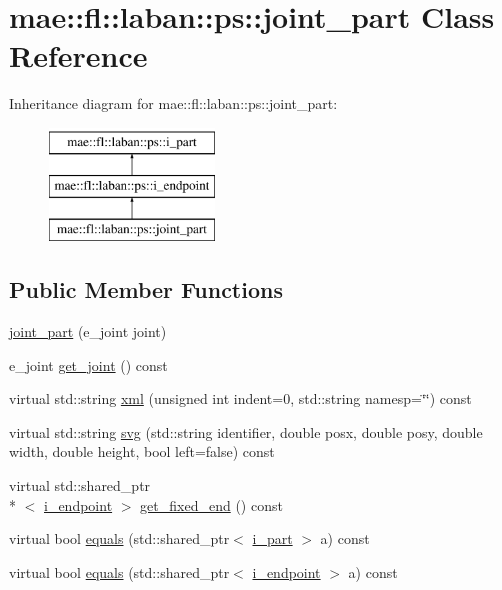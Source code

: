 \hypertarget{classmae_1_1fl_1_1laban_1_1ps_1_1joint__part}{\section{mae\-:\-:fl\-:\-:laban\-:\-:ps\-:\-:joint\-\_\-part Class Reference}
\label{classmae_1_1fl_1_1laban_1_1ps_1_1joint__part}
}
Inheritance diagram for mae\-:\-:fl\-:\-:laban\-:\-:ps\-:\-:joint\-\_\-part\-:\begin{figure}[H]
\begin{center}
\leavevmode
\includegraphics[height=3.000000cm]{classmae_1_1fl_1_1laban_1_1ps_1_1joint__part}
\end{center}
\end{figure}
\subsection*{Public Member Functions}
\begin{DoxyCompactItemize}
\item 
\hyperlink{classmae_1_1fl_1_1laban_1_1ps_1_1joint__part_a7f762c967cd8f22d1f82f5cf15c3de5f}{joint\-\_\-part} (e\-\_\-joint joint)
\item 
e\-\_\-joint \hyperlink{classmae_1_1fl_1_1laban_1_1ps_1_1joint__part_aa7ac33b4e1af216f9359f3f0cb493c0b}{get\-\_\-joint} () const 
\item 
virtual std\-::string \hyperlink{classmae_1_1fl_1_1laban_1_1ps_1_1joint__part_a3054936a94c43d4cb3cb21745234e2cf}{xml} (unsigned int indent=0, std\-::string namesp=\char`\"{}\char`\"{}) const 
\item 
virtual std\-::string \hyperlink{classmae_1_1fl_1_1laban_1_1ps_1_1joint__part_af8e8475612c99842a6b6a18964168592}{svg} (std\-::string identifier, double posx, double posy, double width, double height, bool left=false) const 
\item 
virtual std\-::shared\-\_\-ptr\\*
$<$ \hyperlink{classmae_1_1fl_1_1laban_1_1ps_1_1i__endpoint}{i\-\_\-endpoint} $>$ \hyperlink{classmae_1_1fl_1_1laban_1_1ps_1_1joint__part_a08d427668f18131036b88c2156ccdd3f}{get\-\_\-fixed\-\_\-end} () const 
\item 
virtual bool \hyperlink{classmae_1_1fl_1_1laban_1_1ps_1_1joint__part_a1de75536e4a12e1435e0ec3c4f2edbad}{equals} (std\-::shared\-\_\-ptr$<$ \hyperlink{classmae_1_1fl_1_1laban_1_1ps_1_1i__part}{i\-\_\-part} $>$ a) const 
\item 
virtual bool \hyperlink{classmae_1_1fl_1_1laban_1_1ps_1_1joint__part_ad159de6d5a1adb07b76a4a151541569e}{equals} (std\-::shared\-\_\-ptr$<$ \hyperlink{classmae_1_1fl_1_1laban_1_1ps_1_1i__endpoint}{i\-\_\-endpoint} $>$ a) const 
\end{DoxyCompactItemize}


